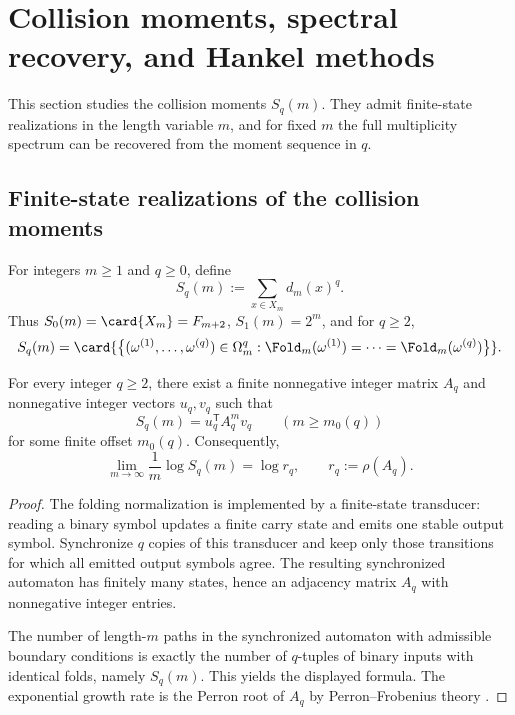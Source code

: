 \section{Collision moments, spectral recovery, and Hankel methods}
\label{sec:moment-kernel}

This section studies the collision moments \(S_q(m)\).  They admit finite-state
realizations in the length variable \(m\), and for fixed \(m\) the full
multiplicity spectrum can be recovered from the moment sequence in \(q\).

\subsection{Finite-state realizations of the collision moments}

\begin{definition}
\label{def:collision-moments}
For integers \(m\ge 1\) and \(q\ge 0\), define
\[
  S_q(m):=\sum_{x\in X_m} d_m(x)^q.
\]
Thus \(S_0(m)=\card{X_m}=F_{m+2}\), \(S_1(m)=2^m\), and for \(q\ge 2\),
\[
  S_q(m)
  =
  \card{\bigl\{(\omega^{(1)},\dots,\omega^{(q)})\in\Omega_m^q:
  \Fold_m(\omega^{(1)})=\cdots=\Fold_m(\omega^{(q)})\bigr\}}.
\]
\end{definition}

\begin{theorem}
\label{thm:collision-kernel}
For every integer \(q\ge 2\), there exist a finite nonnegative integer matrix
\(A_q\) and nonnegative integer vectors \(u_q,v_q\) such that
\[
  S_q(m)=u_q^{\mathsf T}A_q^m v_q
  \qquad (m\ge m_0(q))
\]
for some finite offset \(m_0(q)\).  Consequently,
\[
  \lim_{m\to\infty}\frac{1}{m}\log S_q(m)=\log r_q,
  \qquad
  r_q:=\rho(A_q).
\]
\end{theorem}

\begin{proof}
The folding normalization is implemented by a finite-state transducer: reading a
binary symbol updates a finite carry state and emits one stable output symbol.
Synchronize \(q\) copies of this transducer and keep only those transitions for
which all emitted output symbols agree.  The resulting synchronized automaton
has finitely many states, hence an adjacency matrix \(A_q\) with nonnegative
integer entries.

The number of length-\(m\) paths in the synchronized automaton with admissible
boundary conditions is exactly the number of \(q\)-tuples of binary inputs with
identical folds, namely \(S_q(m)\).  This yields the displayed formula.  The
exponential growth rate is the Perron root of \(A_q\) by Perron--Frobenius
theory \cite{Seneta2006}.
\end{proof}

